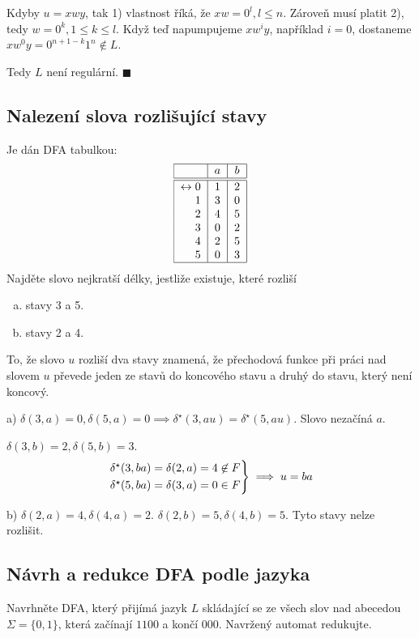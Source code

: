 Kdyby $u = xwy$, tak 1) vlastnost říká, že $xw = 0^l, l \leq n$. Zároveň musí platit 2), tedy $w = 0^k, 1 \leq k \leq l$.
Když teď napumpujeme $xw^i y$, například $i=0$, dostaneme $xw^0 y = 0^{n+1-k} 1^{n} \not\in L$.

Tedy $L$ není regulární. $\blacksquare$

\subsection{Nalezení slova rozlišující stavy}
Je dán DFA tabulkou:
\[
\begin{tabular}{|r|c|c|}
    \hline
    & $a$ & $b$\\
    \hline
    \hline
    $\leftrightarrow 0$& $1$ & $2$\\
    $1$                & $3$ & $0$\\
    $2$                & $4$ & $5$\\
    $3$                & $0$ & $2$\\
    $4$                & $2$ & $5$\\
    $5$                & $0$ & $3$\\
    \hline
\end{tabular}
\]
Najděte slovo nejkratší délky, jestliže existuje, které rozliší
\begin{enumerate}[a), noitemsep]
    \item stavy 3 a 5.
    \item stavy 2 a 4.
\end{enumerate}
To, že slovo $u$ rozliší dva stavy znamená, že přechodová funkce při práci nad slovem $u$ převede jeden ze stavů do 
koncového stavu a druhý do stavu, který není koncový.

a) $\delta(3,a) = 0, \delta(5,a)=0 \implies \delta^\star(3, au) = \delta^\star (5, au)$.
Slovo nezačíná $a$.

$\delta(3,b) = 2, \delta(5, b) = 3$.
\[
\begin{rcases*}
\delta^\star(3,ba) = \delta(2,a) = 4 \not\in F\\
\delta^\star(5,ba) = \delta(3,a) = 0 \in F
\end{rcases*} \implies u = ba
\]

b) $\delta(2,a) = 4, \delta(4,a) =2$. $\delta(2,b)=5, \delta(4,b)=5$. Tyto stavy nelze rozlišit.

\subsection{Návrh a redukce DFA podle jazyka}
Navrhněte DFA, který přijímá jazyk $L$ skládající se ze všech slov nad abecedou $\Sigma = \{0, 1\}$, která začínají 
$1100$ a končí $000$. Navržený automat redukujte.

